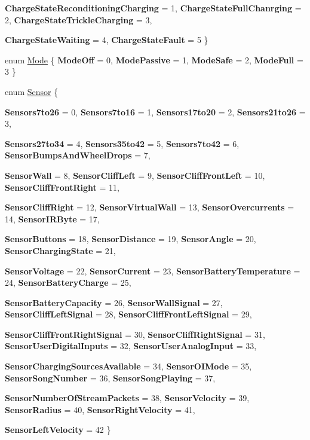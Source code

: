 \begin{DoxyCompactItemize}
{\bfseries ChargeStateReconditioningCharging} =  1, 
{\bfseries ChargeStateFullChanrging} =  2, 
{\bfseries ChargeStateTrickleCharging} =  3, 
\par
{\bfseries ChargeStateWaiting} =  4, 
{\bfseries ChargeStateFault} =  5
 \}
\item 
enum \hyperlink{class_arduino_roomba_aeceb5ee5b7d1b544d70d6223e6e0345c}{Mode} \{ {\bfseries ModeOff} =  0, 
{\bfseries ModePassive} =  1, 
{\bfseries ModeSafe} =  2, 
{\bfseries ModeFull} =  3
 \}
\item 
enum \hyperlink{class_arduino_roomba_afa21b9beadec65f3d9ef5e2f7a8fe469}{Sensor} \{ \par
{\bfseries Sensors7to26} =  0, 
{\bfseries Sensors7to16} =  1, 
{\bfseries Sensors17to20} =  2, 
{\bfseries Sensors21to26} =  3, 
\par
{\bfseries Sensors27to34} =  4, 
{\bfseries Sensors35to42} =  5, 
{\bfseries Sensors7to42} =  6, 
{\bfseries SensorBumpsAndWheelDrops} =  7, 
\par
{\bfseries SensorWall} =  8, 
{\bfseries SensorCliffLeft} =  9, 
{\bfseries SensorCliffFrontLeft} =  10, 
{\bfseries SensorCliffFrontRight} =  11, 
\par
{\bfseries SensorCliffRight} =  12, 
{\bfseries SensorVirtualWall} =  13, 
{\bfseries SensorOvercurrents} =  14, 
{\bfseries SensorIRByte} =  17, 
\par
{\bfseries SensorButtons} =  18, 
{\bfseries SensorDistance} =  19, 
{\bfseries SensorAngle} =  20, 
{\bfseries SensorChargingState} =  21, 
\par
{\bfseries SensorVoltage} =  22, 
{\bfseries SensorCurrent} =  23, 
{\bfseries SensorBatteryTemperature} =  24, 
{\bfseries SensorBatteryCharge} =  25, 
\par
{\bfseries SensorBatteryCapacity} =  26, 
{\bfseries SensorWallSignal} =  27, 
{\bfseries SensorCliffLeftSignal} =  28, 
{\bfseries SensorCliffFrontLeftSignal} =  29, 
\par
{\bfseries SensorCliffFrontRightSignal} =  30, 
{\bfseries SensorCliffRightSignal} =  31, 
{\bfseries SensorUserDigitalInputs} =  32, 
{\bfseries SensorUserAnalogInput} =  33, 
\par
{\bfseries SensorChargingSourcesAvailable} =  34, 
{\bfseries SensorOIMode} =  35, 
{\bfseries SensorSongNumber} =  36, 
{\bfseries SensorSongPlaying} =  37, 
\par
{\bfseries SensorNumberOfStreamPackets} =  38, 
{\bfseries SensorVelocity} =  39, 
{\bfseries SensorRadius} =  40, 
{\bfseries SensorRightVelocity} =  41, 
\par
{\bfseries SensorLeftVelocity} =  42
 \}
\end{DoxyCompactItemize}
